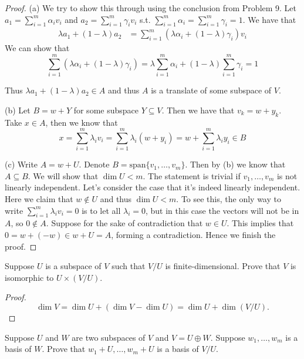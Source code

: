\documentclass{extarticle}
\begin{document}
\begin{proof}
(a) We try to show this through using the conclusion from Problem 9. Let \(a_1 = \sum_{i=1}^{m}\alpha_i v_i\)
and \(a_2 = \sum_{i=1}^{m} \gamma_i v_i\) s.t. \(\sum_{i=1}^{m} \alpha_i = \sum_{i=1}^m \gamma_i = 1\). We have that 
\begin{align*}
    \lambda a_1 + (1 - \lambda) a_2 
    &= \sum_{i=1}^{m} (\lambda \alpha_i + (1 - \lambda) \gamma_i ) v_i 
\end{align*}
We can show that 
\[\sum_{i=1}^{m} (\lambda \alpha_i + (1 - \lambda) \gamma_i ) 
= \lambda \sum_{i=1}^{m} \alpha_i + (1 - \lambda) \sum_{i=1}^{m}\gamma_i = 1\]

Thus \(\lambda a_1 + (1 - \lambda) a_2 \in A\) and thus \(A\) is a translate of some subspace of \(V\). 

(b) Let \(B = w + Y\) for some subspace \(Y \subseteq V\). Then we have 
that \(v_k = w + y_k\). Take \(x \in A\), then we know that 
\[x = \sum_{i=1}^{m} \lambda_i v_i = \sum_{i=1}^{m} 
\lambda_i (w + y_i) = w + \sum_{i=1}^{m} \lambda_i y_i \in B\]

(c) Write \(A = w + U\). Denote \(B = \text{span} \{v_1, \ldots, v_m\}\). 
Then by (b) we know that \(A \subseteq B\). We will show that \(\dim U 
< m\). The statement is trivial if \(v_1, \ldots, v_m\) is not linearly 
independent. Let's consider the case that it's indeed linearly independent. 
Here we claim that \(w \notin U\) and thus \(\dim U < m\). To see this, 
the only way to write \(\sum_{i=1}^{m} \lambda_i v_i = 0\) is to let all 
\(\lambda_i = 0\), but in this case the vectors will not be in \(A\), so 
\(0 \notin A\). Suppose for the sake 
of contradiction that \(w \in U\). 
This implies that \(0 = w + (-w) \in w + U = A\), forming a contradiction. 
Hence we finish the proof. 
\end{proof}

\begin{problem}{13}
    Suppose \(U\) is a subspace of \(V\) such that \(V / U\) is finite-dimensional. 
    Prove that \(V\) is isomorphic to \(U \times (V / U)\). 
\end{problem}

\begin{proof}
\[\dim V = \dim U + (\dim V - \dim U) = \dim U + \dim (V / U).\]
\end{proof}

\begin{problem}{14}
    Suppose \(U\) and \(W\) are two subspaces of \(V\) and \(V = U 
    \oplus W\). Suppose \(w_1, \ldots, w_m\) is a basis of \(W\). 
    Prove that \(w_1 + U, \ldots, w_m + U\) is a basis of 
    \(V / U\).  
\end{problem}
\end{document}
